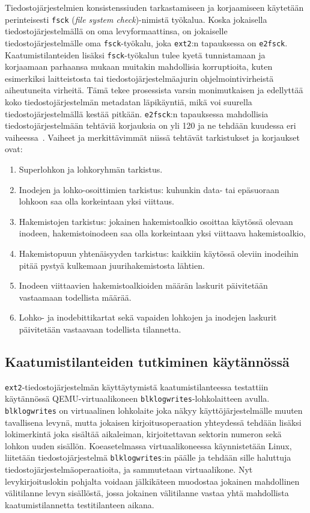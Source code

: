 Tiedostojärjestelmien konsistenssiuden tarkastamiseen ja korjaamiseen käytetään perinteisesti \texttt{fsck} (\emph{file system check})-nimistä työkalua.
Koska jokaisella tiedostojärjestelmällä on oma levyformaattinsa,
on jokaiselle tiedostojärjestelmälle oma \texttt{fsck}-työkalu,
joka \texttt{ext2}:n tapauksessa on \texttt{e2fsck}.
Kaatumistilanteiden lisäksi \texttt{fsck}-työkalun tulee kyetä tunnistamaan ja korjaamaan parhaansa mukaan muitakin mahdollisia korruptioita,
kuten esimerkiksi laitteistosta tai tiedostojärjestelmäajurin ohjelmointivirheistä aiheutuneita virheitä.
Tämä tekee prosessista varsin monimutkaisen ja edellyttää koko tiedostojärjestelmän metadatan läpikäyntiä,
mikä voi suurella tiedostojärjestelmällä kestää pitkään.
\texttt{e2fsck}:n tapauksessa mahdollisia tiedostojärjestelmään tehtäviä korjauksia on yli 120 ja ne tehdään kuudessa eri vaiheessa~\cite{SQCK}.
Vaiheet ja merkittävimmät niissä tehtävät tarkistukset ja korjaukset ovat:
%
\begin{enumerate}
      \item{Superlohkon ja lohkoryhmän tarkistus.}
      \item{Inodejen ja lohko-osoittimien tarkistus:
            kuhunkin data- tai epäsuoraan lohkoon saa olla korkeintaan yksi viittaus.}
        \item{Hakemistojen tarkistus: jokainen hakemistoalkio osoittaa käytössä olevaan inodeen, hakemistoinodeen saa olla korkeintaan yksi viittaava hakemistoalkio,}
      \item{Hakemistopuun yhtenäisyyden tarkistus: kaikkiin käytössä oleviin inodeihin pitää pystyä kulkemaan juurihakemistosta lähtien.}
      \item{Inodeen viittaavien hakemistoalkioiden määrän laskurit päivitetään vastaamaan todellista määrää.}
      \item{Lohko- ja inodebittikartat sekä vapaiden lohkojen ja inodejen laskurit päivitetään vastaavaan todellista tilannetta.}
\end{enumerate}
%

\subsection{Kaatumistilanteiden tutkiminen käytännössä}
\texttt{ext2}-tiedostojärjestelmän käyttäytymistä kaatumistilanteessa testattiin käytännössä QEMU-virtuaalikoneen \texttt{blk\-log\-writes}-lohkolaitteen avulla.
\texttt{blk\-log\-writes} on virtuaalinen lohkolaite joka näkyy käyttöjärjestelmälle muuten tavallisena levynä,
mutta jokaisen kirjoitusoperaation yhteydessä tehdään lisäksi lokimerkintä joka sisältää aikaleiman, kirjoitettavan sektorin numeron sekä lohkon uuden sisällön.
Koeasetelmassa virtuaalikoneessa käynnistetään Linux,
liitetään tiedostojärjestelmä \texttt{blklogwrites}:in päälle ja tehdään sille haluttuja tiedostojärjestelmäoperaatioita,
ja sammutetaan virtuaalikone.
Nyt levykirjoituslokin pohjalta voidaan jälkikäteen muodostaa jokainen mahdollinen välitilanne levyn sisällöstä,
jossa jokainen välitilanne vastaa yhtä mahdollista kaatumistilannetta testitilanteen aikana.


